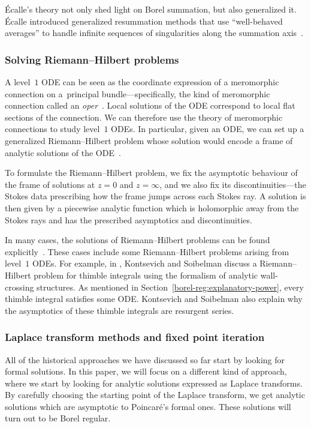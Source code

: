 \documentclass[pdftex]{sigma}
\numberwithin{equation}{section}
\begin{document}
\'{E}calle's theory not only shed light on Borel summation, but also generalized it. \'{E}calle introduced generalized resummation methods that use ``well-behaved averages'' to handle infinite sequences of singularities along the summation axis~\cite{EcalleI,ecalle-dulac,menous_phdthesis,menous-mould}.
%
\subsubsection{Solving Riemann--Hilbert problems}
%
A level~$1$ ODE can be seen as the coordinate expression of a meromorphic connection on a~principal bundle---specifically, the kind of meromorphic connection called an {\em oper}~\cite{BD-opers}. Local solutions of the ODE correspond to local flat sections of the connection. We can therefore use the theory of meromorphic connections to study level~$1$ ODEs. In particular, given an ODE, we can set up a generalized Riemann--Hilbert problem whose solution would encode a frame of analytic solutions of the ODE~\cite[Section~3.2]{Dubrovin-Heun}.

To formulate the Riemann--Hilbert problem, we fix the asymptotic behaviour of the frame of solutions at $z = 0$ and $z = \infty$, and we also fix its discontinuities---the Stokes data prescribing how the frame jumps across each Stokes ray. A solution is then given by a piecewise analytic function which is holomorphic away from the Stokes rays and has the prescribed asymptotics and discontinuities.

In many cases, the solutions of Riemann--Hilbert problems can be found explicitly~\cite{BBS-RH,Tom-RH-1,Tom-RH-conifold,Dubrovin-tt_star,Dubrovin-Heun,GMN1}. These cases include some Riemann--Hilbert problems arising from level~$1$ ODEs. For example, in \cite[Section~6.2.1]{kontsevich2022analyticity}, Kontsevich and Soibelman discuss a Riemann--Hilbert problem for thimble integrals using the formalism of analytic wall-crossing structures. As mentioned in Section~\ref{borel-reg:explanatory-power}, every thimble integral satisfies some ODE. Kontsevich and Soibelman also explain why the asymptotics of these thimble integrals are resurgent series.
%
\subsubsection{Laplace transform methods and fixed point iteration}
%
All of the historical approaches we have discussed so far start by looking for formal solutions. In this paper, we will focus on a different kind of approach, where we start by looking for analytic solutions expressed as Laplace transforms. By carefully choosing the starting point of the Laplace transform, we get analytic solutions which are asymptotic to Poincar\'e's formal ones. These solutions will turn out to be Borel regular.
\end{document}
